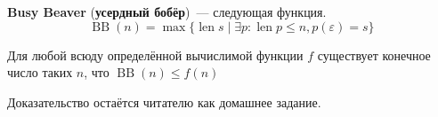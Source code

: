 \documentclass{article}
\begin{document}
    \begin{definition}
        \textbf{Busy Beaver} (\textbf{усердный бобёр})~--- следующая функция.
        $$
        \operatorname{BB}(n)=\max\{\operatorname{len}s\mid\exists p:\operatorname{len}p\leqslant n,p(\varepsilon)=s\}
        $$
    \end{definition}
    \begin{theorem}
        Для любой всюду определённой вычислимой функции $f$ существует конечное число таких $n$, что $\operatorname{BB}(n)\leqslant f(n)$
    \end{theorem}
    \begin{remark}
        Доказательство остаётся читателю как домашнее задание.
    \end{remark}
\end{document}
